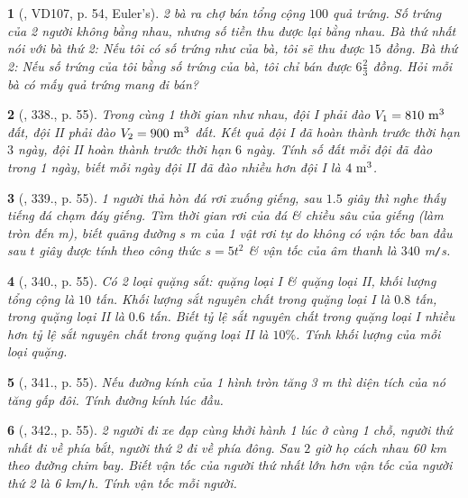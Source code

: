\documentclass{article}
\newtheorem{baitoan}{}
\begin{document}
\begin{baitoan}[\cite{Binh_Toan_9_tap_2}, VD107, p. 54, Euler's]
	2 bà ra chợ bán tổng cộng $100$ quả trứng. Số trứng của 2 người không bằng nhau, nhưng số tiền thu được lại bằng nhau. Bà thứ nhất nói với bà thứ 2: Nếu tôi có số trứng như của bà, tôi sẽ thu được $15$ đồng. Bà thứ 2: Nếu số trứng của tôi bằng số trứng của bà, tôi chỉ bán được $6\frac{2}{3}$ đồng. Hỏi mỗi bà có mấy quả trứng mang đi bán?
\end{baitoan}

\begin{baitoan}[\cite{Binh_Toan_9_tap_2}, 338., p. 55]
	Trong cùng 1 thời gian như nhau, đội I phải đào $V_1 = 810\ {\rm m}^3$ đất, đội II phải đào $V_2 = 900\ {\rm m}^3$ đất. Kết quả đội I đã hoàn thành trước thời hạn $3$ ngày, đội II hoàn thành trước thời hạn $6$ ngày. Tính số đất mỗi đội đã đào trong 1 ngày, biết mỗi ngày đội II đã đào nhiều hơn đội I là $\rm4\ m^3$.
\end{baitoan}

\begin{baitoan}[\cite{Binh_Toan_9_tap_2}, 339., p. 55]
	1 người thả hòn đá rơi xuống giếng, sau $1.5$ giây thì nghe thấy tiếng đá chạm đáy giếng. Tìm thời gian rơi của đá \& chiều sâu của giếng (làm tròn đến {\rm m}), biết quãng đường $s$ {\rm m} của 1 vật rơi tự do không có vận tốc ban đầu sau $t$ giây được tính theo công thức $s = 5t^2$ \& vận tốc của âm thanh là $340$ {\rm m{\tt/}s}.
\end{baitoan}

\begin{baitoan}[\cite{Binh_Toan_9_tap_2}, 340., p. 55]
	Có 2 loại quặng sắt: quặng loại I \& quặng loại II, khối lượng tổng cộng là $10$ tấn. Khối lượng sắt nguyên chất trong quặng loại I là $0.8$ tấn, trong quặng loại II là $0.6$ tấn. Biết tỷ lệ sắt nguyên chất trong quặng loại I nhiều hơn tỷ lệ sắt nguyên chất trong quặng loại II là $10\%$. Tính khối lượng của mỗi loại quặng.
\end{baitoan}

\begin{baitoan}[\cite{Binh_Toan_9_tap_2}, 341., p. 55]
	Nếu đường kính của 1 hình tròn tăng {\rm3 m} thì diện tích của nó tăng gấp đôi. Tính đường kính lúc đầu.
\end{baitoan}

\begin{baitoan}[\cite{Binh_Toan_9_tap_2}, 342., p. 55]
	2 người đi xe đạp cùng khởi hành 1 lúc ở cùng 1 chỗ, người thứ nhất đi về phía bắt, người thứ 2 đi về phía đông. Sau $2$ giờ họ cách nhau {\rm60 km} theo đường chim bay. Biết vận tốc của người thứ nhất lớn hơn vận tốc của người thứ 2 là {\rm6 km{\tt/}h}. Tính vận tốc mỗi người.
\end{baitoan}
\end{document}
